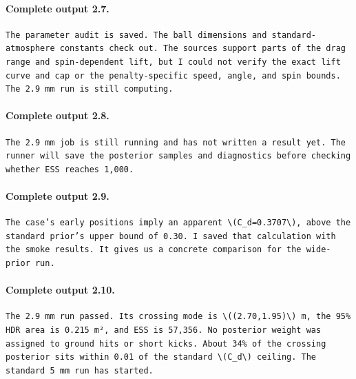 \documentclass[UTF8,10pt]{ctexart}
\begin{document}
\paragraph{Complete output 2.7.}
\begin{Verbatim}[breaklines=true,breakanywhere=true,fontsize=\scriptsize,frame=single,framesep=2pt]
The parameter audit is saved. The ball dimensions and standard-atmosphere constants check out. The sources support parts of the drag range and spin-dependent lift, but I could not verify the exact lift curve and cap or the penalty-specific speed, angle, and spin bounds. The 2.9 mm run is still computing.
\end{Verbatim}

\paragraph{Complete output 2.8.}
\begin{Verbatim}[breaklines=true,breakanywhere=true,fontsize=\scriptsize,frame=single,framesep=2pt]
The 2.9 mm job is still running and has not written a result yet. The runner will save the posterior samples and diagnostics before checking whether ESS reaches 1,000.
\end{Verbatim}

\paragraph{Complete output 2.9.}
\begin{Verbatim}[breaklines=true,breakanywhere=true,fontsize=\scriptsize,frame=single,framesep=2pt]
The case’s early positions imply an apparent \(C_d=0.3707\), above the standard prior’s upper bound of 0.30. I saved that calculation with the smoke results. It gives us a concrete comparison for the wide-prior run.
\end{Verbatim}

\paragraph{Complete output 2.10.}
\begin{Verbatim}[breaklines=true,breakanywhere=true,fontsize=\scriptsize,frame=single,framesep=2pt]
The 2.9 mm run passed. Its crossing mode is \((2.70,1.95)\) m, the 95% HDR area is 0.215 m², and ESS is 57,356. No posterior weight was assigned to ground hits or short kicks. About 34% of the crossing posterior sits within 0.01 of the standard \(C_d\) ceiling. The standard 5 mm run has started.
\end{Verbatim}
\end{document}
